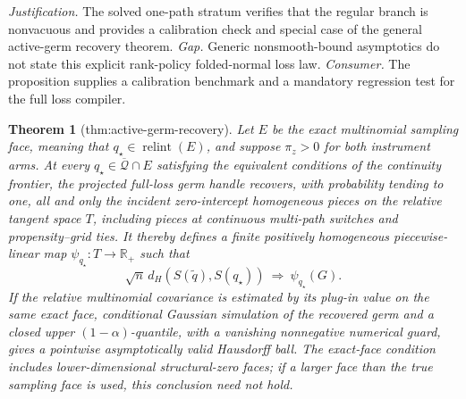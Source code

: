 \documentclass{article}
\newtheorem{theorem}{Theorem}
\begin{document}
\par\smallskip\noindent \textit{Justification.} The solved one-path stratum verifies that the regular branch is nonvacuous and provides a calibration check and special case of the general active-germ recovery theorem. \textit{Gap.} Generic nonsmooth-bound asymptotics do not state this explicit rank-policy folded-normal loss law. \textit{Consumer.} The proposition supplies a calibration benchmark and a mandatory regression test for the full loss compiler.

\begin{theorem}[thm:active-germ-recovery]\label{thm:active-germ-recovery}
Let \(E\) be the exact multinomial sampling face, meaning that \(q_\star\in\operatorname{relint}(E)\), and suppose \(\pi_z>0\) for both instrument arms.  At every \(q_\star\in\overline{\mathcal Q}\cap E\) satisfying the equivalent conditions of the continuity frontier, the projected full-loss germ handle recovers, with probability tending to one, all and only the incident zero-intercept homogeneous pieces on the relative tangent space \(T\), including pieces at continuous multi-path switches and propensity--grid ties.  It thereby defines a finite positively homogeneous piecewise-linear map \(\psi_{q_\star}:T\to\mathbb R_+\) such that
\[
\sqrt n\,d_H(S(\widetilde q),S(q_\star))\ \Rightarrow\ \psi_{q_\star}(G).
\]
If the relative multinomial covariance is estimated by its plug-in value on the same exact face, conditional Gaussian simulation of the recovered germ and a closed upper \((1-\alpha)\)-quantile, with a vanishing nonnegative numerical guard, gives a pointwise asymptotically valid Hausdorff ball.  The exact-face condition includes lower-dimensional structural-zero faces; if a larger face than the true sampling face is used, this conclusion need not hold.
\end{theorem}
\end{document}

